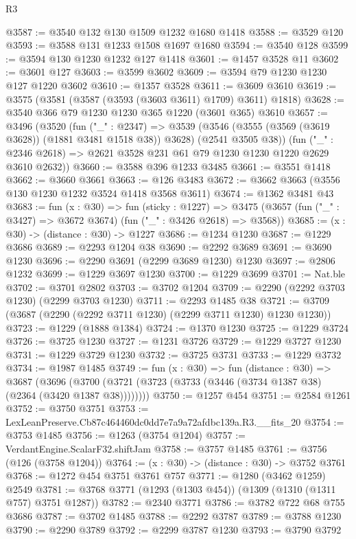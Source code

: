 \begin{lexlean}{R3}
\begin{coremodule}
@3587 := @3540 @132 @130 @1509 @1232 @1680 @1418
@3588 := @3529 @120
@3593 := @3588 @131 @1233 @1508 @1697 @1680
@3594 := @3540 @128
@3599 := @3594 @130 @1230 @1232 @127 @1418
@3601 := @1457 @3528 @11
@3602 := @3601 @127
@3603 := @3599 @3602
@3609 := @3594 @79 @1230 @1230 @127 @1220 @3602
@3610 := @1357 @3528
@3611 := @3609 @3610
@3619 := @3575 (@3581 (@3587 (@3593 (@3603 @3611) @1709) @3611) @1818)
@3628 := @3540 @366 @79 @1230 @1230 @365 @1220 (@3601 @365) @3610
@3657 := @3496
    (@3520
      (fun ("_" : @2347) =>
      @3539 (@3546 (@3555 (@3569 (@3619 @3628)) (@1881 @3481 @1518 @38)) @3628) (@2541 @3505 @38))
      (fun ("_" : @2346 @2618) => @2621 @3528 @231 @61 @79 @1230 @1230 @1220 @2629 @3610 @2632))
@3660 := @3588 @396 @1233 @3485
@3661 := @3551 @1418
@3662 := @3660 @3661
@3663 := @126 @3483
@3672 := @3662 @3663 (@3556 @130 @1230 @1232 @3524 @1418 @3568 @3611)
@3674 := @1362 @3481 @43
@3683 := fun (x : @30) =>
  fun (sticky : @1227) =>
  @3475 (@3657 (fun ("_" : @3427) => @3672 @3674) (fun ("_" : @3426 @2618) => @3568))
@3685 := (x : @30) -> (distance : @30) -> @1227
@3686 := @1234 @1230
@3687 := @1229 @3686
@3689 := @2293 @1204 @38
@3690 := @2292 @3689
@3691 := @3690 @1230
@3696 := @2290 @3691 (@2299 @3689 @1230) @1230
@3697 := @2806 @1232
@3699 := @1229 @3697 @1230
@3700 := @1229 @3699
@3701 := Nat.ble
@3702 := @3701 @2802
@3703 := @3702 @1204
@3709 := @2290 (@2292 @3703 @1230) (@2299 @3703 @1230)
@3711 := @2293 @1485 @38
@3721 := @3709 (@3687 (@2290 (@2292 @3711 @1230) (@2299 @3711 @1230) @1230 @1230))
@3723 := @1229 (@1888 @1384)
@3724 := @1370 @1230
@3725 := @1229 @3724
@3726 := @3725 @1230
@3727 := @1231 @3726
@3729 := @1229 @3727 @1230
@3731 := @1229 @3729 @1230
@3732 := @3725 @3731
@3733 := @1229 @3732
@3734 := @1987 @1485
@3749 := fun (x : @30) =>
  fun (distance : @30) =>
  @3687 (@3696 (@3700 (@3721 (@3723 (@3733 (@3446 (@3734 @1387 @38) (@2364 (@3420 @1387 @38))))))))
@3750 := @1257 @454
@3751 := @2584 @1261
@3752 := @3750 @3751
@3753 := LexLeanPreserve.Cb87c464460dc0dd7e7a9a72afdbc139a.R3.__fits_20
@3754 := @3753 @1485
@3756 := @1263 (@3754 @1204)
@3757 := VerdantEngine.ScalarF32.shiftJam
@3758 := @3757 @1485
@3761 := @3756 (@126 (@3758 @1204))
@3764 := (x : @30) -> (distance : @30) -> @3752 @3761
@3768 := @1272 @454 @3751 @3761 @757
@3771 := @1280 (@3462 @1259) @2549
@3781 := @3768 @3771 (@1293 (@1303 @454)) (@1309 (@1310 (@1311 @757) @3751 @1287))
@3782 := @2340 @3771
@3786 := @3782 @722 @68 @755 @3686
@3787 := @3702 @1485
@3788 := @2292 @3787
@3789 := @3788 @1230
@3790 := @2290 @3789
@3792 := @2299 @3787 @1230
@3793 := @3790 @3792

\end{coremodule}
\end{lexlean}
